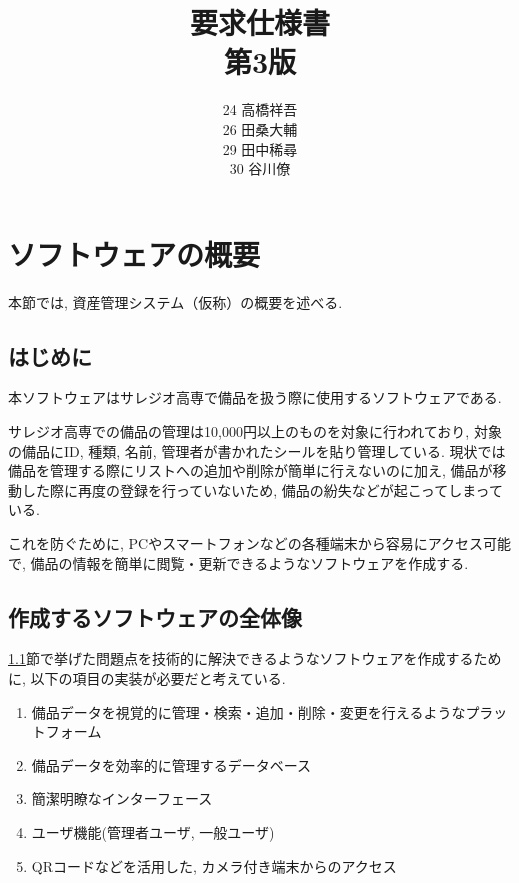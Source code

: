 \documentclass[11ptm]{jsarticle}
\title{{\Huge 要求仕様書}\\第3版}
\author{24 高橋祥吾\\26 田桑大輔\\29 田中稀尋\\30 谷川僚}
\date{}
\begin{document}
\setcounter{page}{0}

\maketitle
\thispagestyle{empty}

\clearpage

\setcounter{page}{0}
\thispagestyle{empty}

\tableofcontents
\clearpage


\section{ソフトウェアの概要}
\label{sec:ソフトウェアの概要}
本節では, 資産管理システム（仮称）の概要を述べる.

\subsection{はじめに}
\label{subsec:はじめに}
本ソフトウェアはサレジオ高専で備品を扱う際に使用するソフトウェアである. \par
サレジオ高専での備品の管理は10,000円以上のものを対象に行われており, 対象の備品にID, 種類, 名前, 管理者が書かれたシールを貼り管理している. 現状では備品を管理する際にリストへの追加や削除が簡単に行えないのに加え, 備品が移動した際に再度の登録を行っていないため, 備品の紛失などが起こってしまっている.\par
これを防ぐために, PCやスマートフォンなどの各種端末から容易にアクセス可能で, 備品の情報を簡単に閲覧・更新できるようなソフトウェアを作成する.

\subsection{作成するソフトウェアの全体像}
\label{subsec:作成するソフトウェアの全体像}
\ref{subsec:はじめに}節で挙げた問題点を技術的に解決できるようなソフトウェアを作成するために, 以下の項目の実装が必要だと考えている.
\begin{enumerate}
  \item 備品データを視覚的に管理・検索・追加・削除・変更を行えるようなプラットフォーム
  \item 備品データを効率的に管理するデータベース
  \item 簡潔明瞭なインターフェース
  \item ユーザ機能(管理者ユーザ, 一般ユーザ)
  \item QRコードなどを活用した, カメラ付き端末からのアクセス
\end{enumerate}
\end{document}
